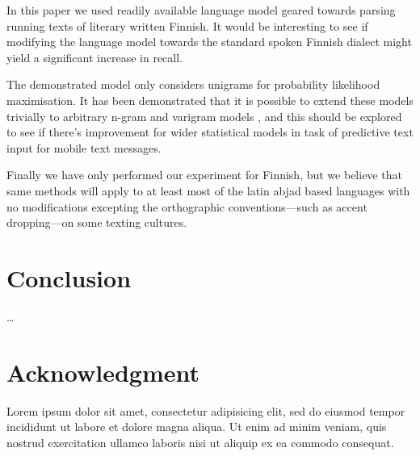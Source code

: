 \documentclass[a4paper,conference]{IEEEtran}
\begin{document}
In this paper we used readily available language model geared towards parsing
running texts of literary written Finnish. It would be interesting to see if
modifying the language model towards the standard spoken Finnish dialect
might yield a significant increase in recall.

The demonstrated model only considers unigrams for probability
likelihood maximisation. It has been demonstrated that it is possible
to extend these models trivially to arbitrary n-gram and varigram
models \cite{Silfverberg/2011}, and this should be explored to see if
there's improvement for wider statistical models in task of predictive
text input for mobile text messages.

Finally we have only performed our experiment for Finnish, but we believe that
same methods will apply to at least most of the latin abjad based languages
with no modifications excepting the orthographic conventions---such as accent
dropping---on some texting cultures.

\section{Conclusion}
\label{sec:conclusions}

\ldots \balance
\section*{Acknowledgment}
Lorem ipsum dolor sit amet, consectetur adipisicing elit, sed do eiusmod tempor incididunt ut labore et dolore magna aliqua. Ut enim ad minim veniam, quis nostrud exercitation ullamco laboris nisi ut aliquip ex ea commodo consequat.

\






\end{document}
